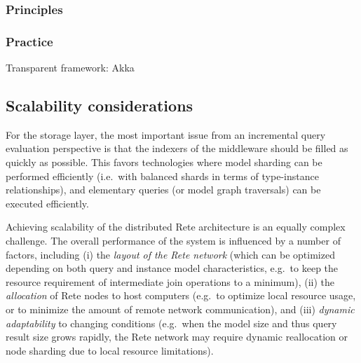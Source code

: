 



\subsubsection{Principles}


\subsubsection{Practice}

Transparent framework: Akka







\subsection{Scalability considerations}
For the storage layer, the most important issue from an incremental query evaluation perspective is that the indexers of the middleware should be filled as quickly as possible. This favors technologies where model sharding can be performed efficiently (i.e.\ with balanced shards in terms of type-instance relationships), and elementary queries (or model graph traversals) can be executed efficiently.

Achieving scalability of the distributed Rete architecture is an equally complex challenge. The overall performance of the system is influenced by a number of factors, including (i) the \emph{layout of the Rete network} (which can be optimized depending on both query and instance model characteristics, e.g.\ to keep the resource requirement of intermediate join operations to a minimum), (ii) the \emph{allocation} of Rete nodes to host computers (e.g.\ to optimize local resource usage, or to minimize the amount of remote network communication), and (iii) \emph{dynamic adaptability} to changing conditions (e.g.\ when the model size and thus query result size grows rapidly, the Rete network may require dynamic reallocation or node sharding due to local resource limitations).

